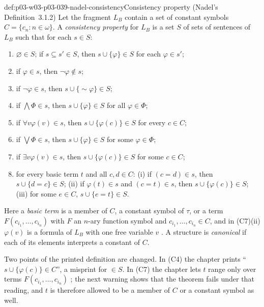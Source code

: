 \begin{hbdefinition}{def:p03-w03-p03-039-nadel-consistency}{Consistency property (Nadel's Definition~3.1.2)}
Let the fragment \(L_B\) contain a set of constant symbols
\(C=\{c_n:n\in\omega\}\). A \emph{consistency property} for \(L_B\) is a set
\(S\) of sets of sentences of \(L_B\) such that for each \(s\in S\):
\begin{enumerate}
\item[(C0)] \(\varnothing\in S\); if \(s\subseteq s'\in S\), then
      \(s\cup\{\varphi\}\in S\) for each \(\varphi\in s'\);
\item[(C1)] if \(\varphi\in s\), then \(\neg\varphi\notin s\);
\item[(C2)] if \(\neg\varphi\in s\), then \(s\cup\{{\sim}\varphi\}\in S\);
\item[(C3)] if \(\bigwedge\Phi\in s\), then \(s\cup\{\varphi\}\in S\) for all \(\varphi\in\Phi\);
\item[(C4)] if \(\forall v\varphi(v)\in s\), then \(s\cup\{\varphi(c)\}\in S\) for every \(c\in C\);
\item[(C5)] if \(\bigvee\Phi\in s\), then \(s\cup\{\varphi\}\in S\) for some \(\varphi\in\Phi\);
\item[(C6)] if \(\exists v\varphi(v)\in s\), then \(s\cup\{\varphi(c)\}\in S\) for some \(c\in C\);
\item[(C7)] for every basic term \(t\) and all \(c,d\in C\):
      (i) if \((c=d)\in s\), then \(s\cup\{d=c\}\in S\);
      (ii) if \(\varphi(t)\in s\) and \((c=t)\in s\), then \(s\cup\{\varphi(c)\}\in S\);
      (iii) for some \(e\in C\), \(s\cup\{e=t\}\in S\).
\end{enumerate}
Here a \emph{basic term} is a member of \(C\), a constant symbol of
\(\tau\), or a term \(F(c_{i_1},\dots,c_{i_n})\) with \(F\) an \(n\)-ary
function symbol and \(c_{i_1},\dots,c_{i_n}\in C\), and in (C7)(ii)
\(\varphi(v)\) is a formula of \(L_B\) with one free variable \(v\)
\cite[Def.~3.1.2, p.~279]{Nadel1985Admissible}. A structure is
\emph{canonical} if each of its elements interprets a constant of \(C\).
\end{hbdefinition}

Two points of the printed definition are changed. In (C4) the chapter
prints ``\(s\cup\{\varphi(c)\}\in C\)'', a misprint for \(\in S\). In (C7)
the chapter lets \(t\) range only over terms \(F(c_{i_1},\dots,c_{i_n})\)
\cite[p.~279]{Nadel1985Admissible}; the next warning shows that the theorem
fails under that reading, and \(t\) is therefore allowed to be a member of
\(C\) or a constant symbol as well.

